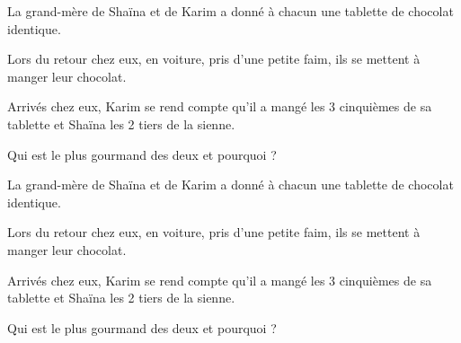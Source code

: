 \documentclass[a4paper]{book}
\begin{document}
\setcounter{chapter}{7}
\renewcommand{\monTitre}{Les fractions - Comparaison}

\setcounter{exo}{1}
\enteteActivite{6}{\monTitre}{\thechapter}

    \begin{exercice}
        La grand-mère de Shaïna et de Karim a donné à chacun une tablette de chocolat identique.
           
        Lors du retour chez eux, en voiture, pris d'une petite faim, ils se mettent à manger leur chocolat.
    
        Arrivés chez eux, Karim se rend compte qu'il a mangé les 3 cinquièmes de sa tablette et Shaïna les 2 tiers de la sienne.
        
        Qui est le plus gourmand des deux et pourquoi ?
    \end{exercice}

    \begin{center}
    \end{center}

\bigskip
        

        \begin{exercice}
        La grand-mère de Shaïna et de Karim a donné à chacun une tablette de chocolat identique.
           
        Lors du retour chez eux, en voiture, pris d'une petite faim, ils se mettent à manger leur chocolat.
    
        Arrivés chez eux, Karim se rend compte qu'il a mangé les 3 cinquièmes de sa tablette et Shaïna les 2 tiers de la sienne.
        
        Qui est le plus gourmand des deux et pourquoi ?
    \end{exercice}

    \begin{center}
    \end{center}
\end{document}
